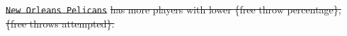 \documentclass{tikzposter} %
\providecommand{\DIFdeltex}[1]{{\protect\color{red}\sout{#1}}}                      %
\providecommand{\DIFdelbegin}{} %
\providecommand{\DIFdelend}{} %
\providecommand{\DIFdel}[1]{\texorpdfstring{\DIFdeltex{#1}}{}} %
\newcommand{\DIFscaledelfig}{0.5}
\newlength{\DIFdelgraphicswidth} %
\newlength{\DIFdelgraphicsheight} %
\newcommand{\DIFdelincludegraphics}[2][]{%
\sbox{\DIFdelgraphicsbox}{\DIFOincludegraphics[#1]{#2}}%
\settoboxwidth{\DIFdelgraphicswidth}{\DIFdelgraphicsbox} %
\settoboxtotalheight{\DIFdelgraphicsheight}{\DIFdelgraphicsbox} %
\scalebox{\DIFscaledelfig}{%
\parbox[b]{\DIFdelgraphicswidth}{\usebox{\DIFdelgraphicsbox}\\[-\baselineskip] \rule{\DIFdelgraphicswidth}{0em}}\llap{\resizebox{\DIFdelgraphicswidth}{\DIFdelgraphicsheight}{%
\setlength{\unitlength}{\DIFdelgraphicswidth}%
\begin{picture}(1,1)%
\thicklines\linethickness{2pt} %
{\color[rgb]{1,0,0}\put(0,0){\framebox(1,1){}}}%
{\color[rgb]{1,0,0}\put(0,0){\line( 1,1){1}}}%
{\color[rgb]{1,0,0}\put(0,1){\line(1,-1){1}}}%
\end{picture}%
}\hspace*{3pt}}} %
} %
\DeclareRobustCommand{\DIFdelbegin}{\DIFOdelbegin \let\includegraphics\DIFdelincludegraphics} %
\DeclareRobustCommand{\DIFdelend}{\DIFOaddend \let\includegraphics\DIFOincludegraphics} %
\begin{document}
\begin{columns}
{\begin{minipage}{0.5\linewidth}
    \centering
\DIFdelbegin %

\DIFdelend %
%
\end{minipage}
\hfill
\begin{minipage}{0.5\linewidth}
    \centering
\DIFdelbegin %

\DIFdelend %
%
\end{minipage}
\DIFdelbegin %
\begin{description}%
\item%
\texttt{\DIFdel{New Orleans Pelicans}} %
\DIFdel{has more players with
lower \{free throw percentage\}, \{free throws attempted\}.
}
\end{description}%
\DIFdelend %
}



\end{columns}
\end{document}
